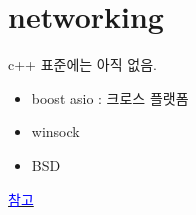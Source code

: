 \documentclass[10pt]{beamer}
\begin{document}
\section{networking}


\begin{frame}{}
    c++ 표준에는 아직 없음.
    \begin{itemize}
        \item boost asio : 크로스 플랫폼
        \item winsock
        \item BSD
    \end{itemize}
    
    \href{https://jacking.tistory.com/1267}{\textcolor{blue}{참고}}
    
\end{frame}


    









\end{document}

